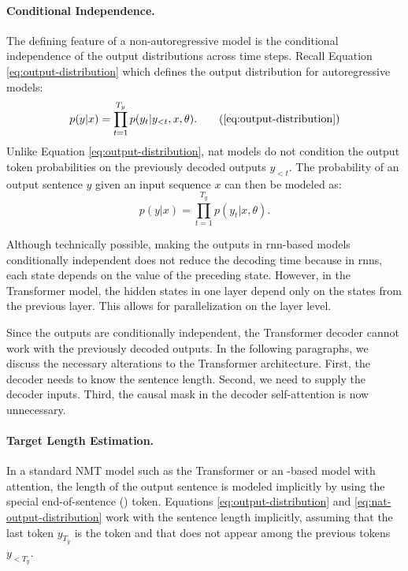 \paragraph{Conditional Independence.} The defining feature of a
non-autoregressive model is the conditional independence of the output
distributions across time steps. Recall Equation \ref{eq:output-distribution}
which defines the output distribution for autoregressive models:
%
\begin{equation}
  p(y|x) = \prod_{t=1}^{T_y}p(y_t|y_{<t},x,\theta).
  \tag{\ref{eq:output-distribution}}
\end{equation}
%
Unlike Equation \ref{eq:output-distribution}, \Ac{nat} models do not condition
the output token probabilities on the previously decoded outputs $y_{<t}$.  The
probability of an output sentence $y$ given an input sequence $x$ can then be
modeled as:
%
\begin{equation}
  p(y|x) = \prod_{t=1}^{T_y}p(y_t|x,\theta).
  \label{eq:nat-output-distribution}
\end{equation}

Although technically possible, making the outputs in \acs{rnn}-based models
conditionally independent does not reduce the decoding time because in
\acsp{rnn}, each state depends on the value of the preceding state. However, in
the Transformer model, the hidden states in one layer depend only on the states
from the previous layer. This allows for parallelization on the layer level.

Since the outputs are conditionally independent, the Transformer decoder cannot
work with the previously decoded outputs. In the following paragraphs, we
discuss the necessary alterations to the Transformer architecture.  First, the
decoder needs to know the sentence length. Second, we need to supply the
decoder inputs. Third, the causal mask in the decoder self-attention is now
unnecessary.

\paragraph{Target Length Estimation.} In a standard NMT model such as the
Transformer or an -based model with attention, the length of
the output sentence is modeled implicitly by using the special end-of-sentence
(\eos{}) token. Equations \ref{eq:output-distribution} and
\ref{eq:nat-output-distribution} work with the sentence length implicitly,
assuming that the last token $y_{T_y}$ is the \eos{} token and that \eos{} does not
appear among the previous tokens $y_{<T_y}$.

